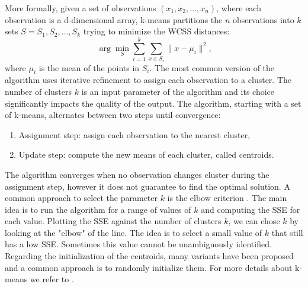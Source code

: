 \noindent
More formally, given a set of observations $(x_1, x_2, \dots, x_n)$, where each observation is a d-dimensional array, k-means partitions the $n$ observations into $k$ sets $S = {S_1, S_2, \dots, S_k}$ trying to minimize the \acf{WCSS} distances:
\begin{equation}
    \arg\min_{S} \sum_{i=1}^{k} \sum_{x \in S_i} \lVert x - \mu_i \rVert^2 \text{,}
\end{equation}
where $\mu_i$ is the mean of the points in $S_i$.
The most common version of the algorithm uses iterative refinement to assign each observation to a cluster. The number of clusters $k$ is an input parameter of the algorithm and its choice significantly impacts the quality of the output.
The algorithm, starting with a set of k-means, alternates between two steps until convergence:
\begin{enumerate}
    \item Assignment step: assign each observation to the nearest cluster,
    \item Update step: compute the new means of each cluster, called centroids.
\end{enumerate}
The algorithm converges when no observation changes cluster during the assignment step, however it does not guarantee to find the optimal solution.
A common approach to select the parameter $k$ is the elbow criterion \cite{wierzchon_cluster_2018}. The main idea is to run the algorithm for a range of values of $k$ and computing the \acf{SSE} for each value. Plotting the SSE against the number of clusters $k$, we can chose $k$ by looking at the "elbow" of the line. The idea is to select a small value of $k$ that still has a low SSE. Sometimes this value cannot be unambiguously identified. Regarding the initialization of the centroids, many variants have been proposed and a common approach is to randomly initialize them. For more details about k-means we refer to \cite{wu_advances_2012}.







